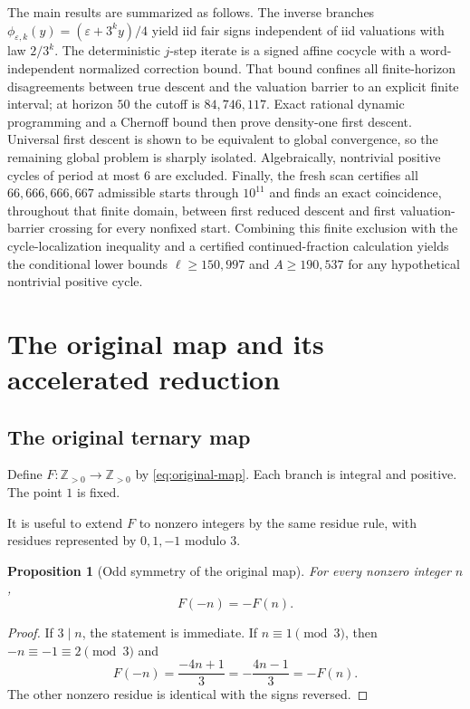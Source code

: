 \documentclass[11pt]{article}
\newtheorem{proposition}[theorem]{Proposition}
\theoremstyle{definition}
\theoremstyle{remark}
\newcommand{\Z}{\mathbb Z}
\begin{document}
The main results are summarized as follows.  The inverse branches
\(\phi_{\varepsilon,k}(y)=(\varepsilon+3^k y)/4\) yield iid fair signs independent of iid valuations with law $2/3^k$.  The deterministic $j$-step iterate is a signed affine cocycle with a word-independent normalized correction bound.  That bound confines all finite-horizon disagreements between true descent and the valuation barrier to an explicit finite interval; at horizon $50$ the cutoff is $84{,}746{,}117$.  Exact rational dynamic programming and a Chernoff bound then prove density-one first descent.  Universal first descent is shown to be equivalent to global convergence, so the remaining global problem is sharply isolated.  Algebraically, nontrivial positive cycles of period at most $6$ are excluded.  Finally, the fresh scan certifies all $66{,}666{,}666{,}667$ admissible starts through $10^{11}$ and finds an exact coincidence, throughout that finite domain, between first reduced descent and first valuation-barrier crossing for every nonfixed start.  Combining this finite exclusion with the cycle-localization inequality and a certified continued-fraction calculation yields the conditional lower bounds $\ell\ge150{,}997$ and $A\ge190{,}537$ for any hypothetical nontrivial positive cycle.

\section{The original map and its accelerated reduction}

\subsection{The original ternary map}

Define \(F:\Z_{>0}\to\Z_{>0}\) by \eqref{eq:original-map}.  Each branch is integral and positive.  The point $1$ is fixed.

It is useful to extend $F$ to nonzero integers by the same residue rule, with residues represented by $0,1,-1$ modulo $3$.

\begin{proposition}[Odd symmetry of the original map]
For every nonzero integer $n$,
\[
F(-n)=-F(n).
\]
\end{proposition}

\begin{proof}
If $3\mid n$, the statement is immediate.  If $n\equiv1\pmod3$, then $-n\equiv-1\equiv2\pmod3$ and
\[
F(-n)=\frac{-4n+1}{3}=-\frac{4n-1}{3}=-F(n).
\]
The other nonzero residue is identical with the signs reversed.
\end{proof}
\end{document}
